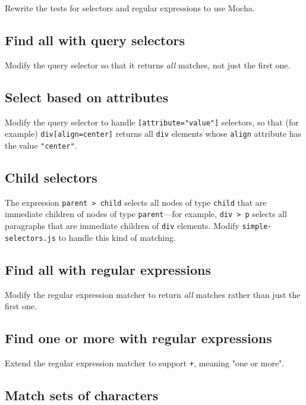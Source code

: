 \documentclass[krantzl]{krantz}
\begin{document}
Rewrite the tests for selectors and regular expressions to use Mocha.

\subsection*{Find all with query selectors}


Modify the query selector so that it returns \emph{all} matches, not just the first one.

\subsection*{Select based on attributes}


Modify the query selector to handle \texttt{[attribute="value"]} selectors,
so that (for example) \texttt{div[align=center]} returns all \texttt{div} elements
whose \texttt{align} attribute has the value \texttt{"center"}.

\subsection*{Child selectors}


The expression \texttt{parent > child} selects all nodes of type \texttt{child}
that are immediate children of nodes of type \texttt{parent}---for example,
\texttt{div > p} selects all paragraphs that are immediate children of \texttt{div} elements.
Modify \texttt{simple-selectors.js} to handle this kind of matching.

\subsection*{Find all with regular expressions}


Modify the regular expression matcher to return \emph{all} matches rather than just the first one.

\subsection*{Find one or more with regular expressions}


Extend the regular expression matcher to support \texttt{+}, meaning "one or more".

\subsection*{Match sets of characters}
\end{document}
